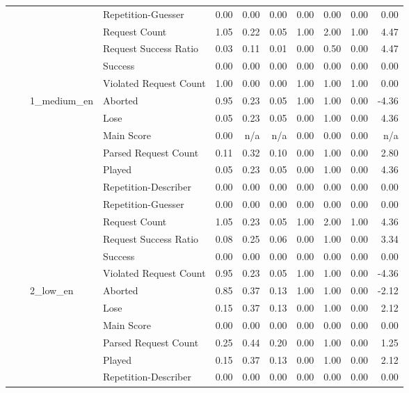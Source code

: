 \begin{tabular}{llllrrrrrrr}
 &  &  & Repetition-Guesser & 0.00 & 0.00 & 0.00 & 0.00 & 0.00 & 0.00 & 0.00 \\
 &  &  & Request Count & 1.05 & 0.22 & 0.05 & 1.00 & 2.00 & 1.00 & 4.47 \\
 &  &  & Request Success Ratio & 0.03 & 0.11 & 0.01 & 0.00 & 0.50 & 0.00 & 4.47 \\
 &  &  & Success & 0.00 & 0.00 & 0.00 & 0.00 & 0.00 & 0.00 & 0.00 \\
 &  &  & Violated Request Count & 1.00 & 0.00 & 0.00 & 1.00 & 1.00 & 1.00 & 0.00 \\
\cline{3-11}
 &  & \multirow[t]{11}{*}{1_medium_en} & Aborted & 0.95 & 0.23 & 0.05 & 1.00 & 1.00 & 0.00 & -4.36 \\
 &  &  & Lose & 0.05 & 0.23 & 0.05 & 0.00 & 1.00 & 0.00 & 4.36 \\
 &  &  & Main Score & 0.00 & n/a & n/a & 0.00 & 0.00 & 0.00 & n/a \\
 &  &  & Parsed Request Count & 0.11 & 0.32 & 0.10 & 0.00 & 1.00 & 0.00 & 2.80 \\
 &  &  & Played & 0.05 & 0.23 & 0.05 & 0.00 & 1.00 & 0.00 & 4.36 \\
 &  &  & Repetition-Describer & 0.00 & 0.00 & 0.00 & 0.00 & 0.00 & 0.00 & 0.00 \\
 &  &  & Repetition-Guesser & 0.00 & 0.00 & 0.00 & 0.00 & 0.00 & 0.00 & 0.00 \\
 &  &  & Request Count & 1.05 & 0.23 & 0.05 & 1.00 & 2.00 & 1.00 & 4.36 \\
 &  &  & Request Success Ratio & 0.08 & 0.25 & 0.06 & 0.00 & 1.00 & 0.00 & 3.34 \\
 &  &  & Success & 0.00 & 0.00 & 0.00 & 0.00 & 0.00 & 0.00 & 0.00 \\
 &  &  & Violated Request Count & 0.95 & 0.23 & 0.05 & 1.00 & 1.00 & 0.00 & -4.36 \\
\cline{3-11}
 &  & \multirow[t]{11}{*}{2_low_en} & Aborted & 0.85 & 0.37 & 0.13 & 1.00 & 1.00 & 0.00 & -2.12 \\
 &  &  & Lose & 0.15 & 0.37 & 0.13 & 0.00 & 1.00 & 0.00 & 2.12 \\
 &  &  & Main Score & 0.00 & 0.00 & 0.00 & 0.00 & 0.00 & 0.00 & 0.00 \\
 &  &  & Parsed Request Count & 0.25 & 0.44 & 0.20 & 0.00 & 1.00 & 0.00 & 1.25 \\
 &  &  & Played & 0.15 & 0.37 & 0.13 & 0.00 & 1.00 & 0.00 & 2.12 \\
 &  &  & Repetition-Describer & 0.00 & 0.00 & 0.00 & 0.00 & 0.00 & 0.00 & 0.00 \\

\end{tabular}
